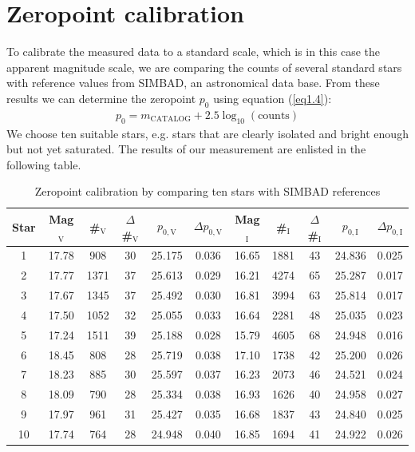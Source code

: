 \section{Zeropoint calibration}\label{sec:zeropoint}
To calibrate the measured data to a standard scale, which is in this case the apparent magnitude scale, we are comparing the counts of several standard stars with reference values from SIMBAD, an astronomical data base. From these results we can determine the zeropoint $p_0$ using equation (\ref{eq1.4}): 
	\begin{align*}
		p_0 = m_{\text{CATALOG}} + 2.5\log_{10}(\text{counts})
	\end{align*}
	We choose ten suitable stars, e.g. stars that are clearly isolated and bright enough but not yet saturated. 
\newpage
The results of our measurement are enlisted in the following table.
	
	\begin{table}[H]
\setlength{\tabcolsep}{2mm}
\renewcommand{\arraystretch}{1.5}
\begin{adjustbox}{width=\textwidth} 
\begin{tabular}{|c||c c c c c||c c c c c|}
\hline
Star & Mag$_{\text{V}}$ & \#$_{\text{V}}$ & $\Delta$\#$_{\text{V}}$ & $p_{0,\text{V}}$ &$\Delta p_{0,\text{V}}$ & Mag$_{\text{I}}$ & \#$_{\text{I}}$ & $\Delta$\#$_{\text{I}}$ & $p_{0,\text{I}}$ &$\Delta p_{0,\text{I}}$\\ \hline \hline
1 & 17.78 & 908 & 30 & 25.175 & 0.036 & 16.65 & 1881 & 43 & 24.836 & 0.025 \\
2 & 17.77 & 1371 & 37 & 25.613 & 0.029 & 16.21 & 4274 & 65 & 25.287 & 0.017 \\
3 & 17.67 & 1345 & 37 & 25.492 & 0.030 & 16.81 & 3994 & 63 & 25.814 & 0.017 \\
4 & 17.50 & 1052 & 32 & 25.055 & 0.033 & 16.64 & 2281 & 48 & 25.035 & 0.023 \\
5 & 17.24 & 1511 & 39 & 25.188& 0.028 & 15.79 & 4605 & 68 & 24.948 & 0.016 \\
6 & 18.45 & 808 & 28 & 25.719 & 0.038 & 17.10 & 1738 & 42 &  25.200 & 0.026 \\
7 & 18.23 & 885 & 30 & 25.597 & 0.037 & 16.23 & 2073 & 46 &  24.521 & 0.024 \\
8 & 18.09 & 790 & 28 & 25.334 & 0.038 & 16.93 & 1626 & 40 & 24.958 & 0.027 \\
9 & 17.97 & 961 & 31 & 25.427 & 0.035 & 16.68 & 1837 & 43 &  24.840 & 0.025 \\
10 & 17.74 & 764 & 28 & 24.948 & 0.040 & 16.85 &  1694 & 41 & 24.922 & 0.026 \\
\hline
\end{tabular}
\end{adjustbox}
\caption{\label{tab:2} Zeropoint calibration by comparing ten stars with SIMBAD references}
\end{table}

